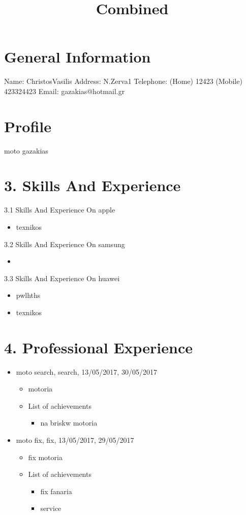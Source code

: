 \documentclass{article}
\title{Combined}
\begin{document}
 
 \section{ General Information} 
 {Name: ChristosVasilis} \newline 
 {Address: N.Zerva1} \newline 
 {Telephone: (Home) 12423}  	{(Mobile) 423324423} \newline 
 {Email: gazakias@hotmail.gr}
 \section{Profile} 
 {moto gazakias}
 \section{3. Skills And Experience} 
{3.1 Skills And Experience On apple}
\begin{itemize} 
\item {texnikos}
\end{itemize} 
{3.2 Skills And Experience On samsung}
\begin{itemize} 
\item {}\end{itemize} 
{3.3 Skills And Experience On huawei}
\begin{itemize} 
\item {pwlhths}
\item {texnikos}
\end{itemize} 
 \section{4. Professional Experience} 
\renewcommand{\labelitemii}{$\circ$} 
 \renewcommand{\labelitemiii}{\tiny$\blacksquare$} 
\begin{itemize} 
\item {moto search, search, 13/05/2017, 30/05/2017}
\begin{itemize} 
\item {motoria}
 \item {List of achievements}
\begin{itemize} 
\item {na briskw motoria}
\end{itemize} 
\end{itemize} 
\end{itemize} 
\begin{itemize} 
\item {moto fix, fix, 13/05/2017, 29/05/2017}
\begin{itemize} 
\item {fix motoria}
 \item {List of achievements}
\begin{itemize} 
\item {fix fanaria}
\item {service}
\end{itemize} 
\end{itemize} 
\end{itemize} 
\end{document}
